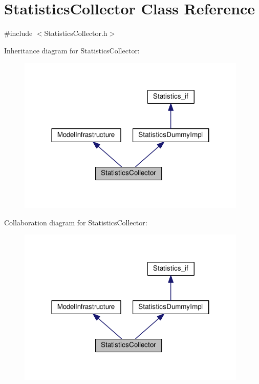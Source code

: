 \hypertarget{class_statistics_collector}{}\section{Statistics\+Collector Class Reference}
\label{class_statistics_collector}


{\ttfamily \#include $<$Statistics\+Collector.\+h$>$}



Inheritance diagram for Statistics\+Collector\+:
\nopagebreak
\begin{figure}[H]
\begin{center}
\leavevmode
\includegraphics[width=310pt]{class_statistics_collector__inherit__graph}
\end{center}
\end{figure}


Collaboration diagram for Statistics\+Collector\+:
\nopagebreak
\begin{figure}[H]
\begin{center}
\leavevmode
\includegraphics[width=310pt]{class_statistics_collector__coll__graph}
\end{center}
\end{figure}
